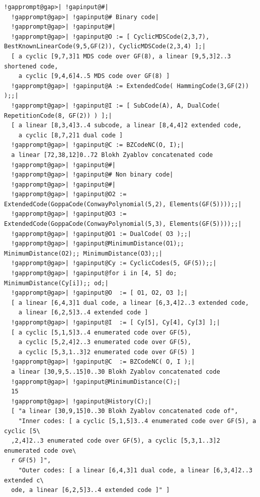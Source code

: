 \documentclass[a4paper,11pt]{report}
\begin{document}
{{ 
\begin{Verbatim}[commandchars=!@|,fontsize=\small,frame=single,label=Example]
  !gapprompt@gap>| !gapinput@#|
  !gapprompt@gap>| !gapinput@# Binary code|
  !gapprompt@gap>| !gapinput@#|
  !gapprompt@gap>| !gapinput@O := [ CyclicMDSCode(2,3,7), BestKnownLinearCode(9,5,GF(2)), CyclicMDSCode(2,3,4) ];|
  [ a cyclic [9,7,3]1 MDS code over GF(8), a linear [9,5,3]2..3 shortened code, 
    a cyclic [9,4,6]4..5 MDS code over GF(8) ]
  !gapprompt@gap>| !gapinput@A := ExtendedCode( HammingCode(3,GF(2)) );;|
  !gapprompt@gap>| !gapinput@I := [ SubCode(A), A, DualCode( RepetitionCode(8, GF(2)) ) ];|
  [ a linear [8,3,4]3..4 subcode, a linear [8,4,4]2 extended code, 
    a cyclic [8,7,2]1 dual code ]
  !gapprompt@gap>| !gapinput@C := BZCodeNC(O, I);|
  a linear [72,38,12]0..72 Blokh Zyablov concatenated code
  !gapprompt@gap>| !gapinput@#|
  !gapprompt@gap>| !gapinput@# Non binary code|
  !gapprompt@gap>| !gapinput@#|
  !gapprompt@gap>| !gapinput@O2 := ExtendedCode(GoppaCode(ConwayPolynomial(5,2), Elements(GF(5))));;|
  !gapprompt@gap>| !gapinput@O3 := ExtendedCode(GoppaCode(ConwayPolynomial(5,3), Elements(GF(5))));;|
  !gapprompt@gap>| !gapinput@O1 := DualCode( O3 );;|
  !gapprompt@gap>| !gapinput@MinimumDistance(O1);; MinimumDistance(O2);; MinimumDistance(O3);;|
  !gapprompt@gap>| !gapinput@Cy := CyclicCodes(5, GF(5));;|
  !gapprompt@gap>| !gapinput@for i in [4, 5] do; MinimumDistance(Cy[i]);; od;|
  !gapprompt@gap>| !gapinput@O  := [ O1, O2, O3 ];|
  [ a linear [6,4,3]1 dual code, a linear [6,3,4]2..3 extended code, 
    a linear [6,2,5]3..4 extended code ]
  !gapprompt@gap>| !gapinput@I  := [ Cy[5], Cy[4], Cy[3] ];|
  [ a cyclic [5,1,5]3..4 enumerated code over GF(5), 
    a cyclic [5,2,4]2..3 enumerated code over GF(5), 
    a cyclic [5,3,1..3]2 enumerated code over GF(5) ]
  !gapprompt@gap>| !gapinput@C  := BZCodeNC( O, I );|
  a linear [30,9,5..15]0..30 Blokh Zyablov concatenated code
  !gapprompt@gap>| !gapinput@MinimumDistance(C);|
  15
  !gapprompt@gap>| !gapinput@History(C);|
  [ "a linear [30,9,15]0..30 Blokh Zyablov concatenated code of", 
    "Inner codes: [ a cyclic [5,1,5]3..4 enumerated code over GF(5), a cyclic [5\
  ,2,4]2..3 enumerated code over GF(5), a cyclic [5,3,1..3]2 enumerated code ove\
  r GF(5) ]", 
    "Outer codes: [ a linear [6,4,3]1 dual code, a linear [6,3,4]2..3 extended c\
  ode, a linear [6,2,5]3..4 extended code ]" ]
\end{Verbatim}
  }

 }

 
\end{document}
